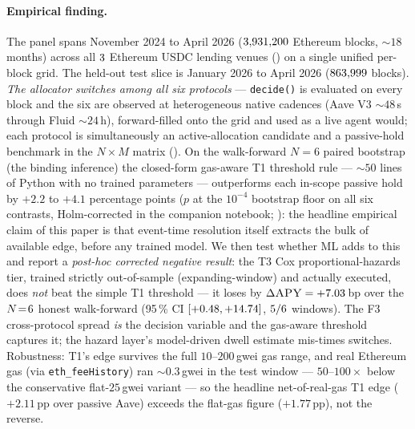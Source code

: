 \paragraph{Empirical finding.}
The panel spans November 2024 to April 2026 ($3{,}931{,}200$ Ethereum
blocks, $\sim 18$ months) across all $3$ Ethereum USDC
lending venues (\ProtocolList) on a single unified per-block grid.
The held-out test slice is January 2026 to April 2026 ($863{,}999$
blocks).  \emph{The allocator switches among all six protocols} ---
\texttt{decide()} is evaluated on every block and the six are
observed at heterogeneous native cadences (Aave V3 $\sim 48$\,s
through Fluid $\sim 24$\,h), forward-filled onto the grid and used as
a live agent would; each protocol is simultaneously an
active-allocation candidate and a passive-hold benchmark in the
$N\!\times\!M$ matrix ().  On the
walk-forward $N\!=\!6$ paired
bootstrap (the binding inference) the closed-form gas-aware T1
threshold rule --- $\sim 50$ lines of Python with no trained
parameters --- outperforms each in-scope passive hold by $+2.2$ to
$+4.1$ percentage points ($p$ at the $10^{-4}$ bootstrap floor on all six contrasts, Holm-corrected in the companion notebook;
): the headline empirical claim of this paper is
that event-time resolution itself extracts the bulk of available
edge, before any trained model.  We then test whether ML adds to
this and report a \emph{post-hoc corrected negative result}: the T3
Cox proportional-hazards tier, trained strictly out-of-sample
(expanding-window) and actually executed, does \emph{not} beat the
simple T1 threshold --- it loses by $\Delta\textsc{APY} =
+7.03$\,bp over the $N\!=\!6$ honest
walk-forward (95\,\% CI $[+0.48, +14.74]$,
$5/6$ windows).  The F3 cross-protocol
spread \emph{is} the decision variable and the gas-aware threshold
captures it; the hazard layer's model-driven dwell estimate
mis-times switches.  Robustness: T1's edge survives the full
$10$--$200$\,gwei gas range, and real Ethereum gas
(via \texttt{eth\_feeHistory}) ran $\sim 0.3$\,gwei in the test
window --- $50$--$100\times$ below the conservative flat-$25$\,gwei
variant --- so the headline net-of-real-gas T1 edge ($+2.11$\,pp over
passive Aave) exceeds the flat-gas figure ($+1.77$\,pp), not the
reverse.

